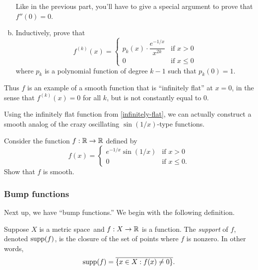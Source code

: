 \begin{exercise}
\begin{enumerate}[(a)]
		\begin{hint}
			Like in the previous part, you'll have to give a special argument to prove that $f''(0) = 0$. 
		\end{hint}
		
		\item Inductively, prove that
		\[ f^{(k)}(x) = \begin{cases} p_k(x) \cdot \dfrac{e^{-1/x}}{x^{2k}} & \text{if } x > 0 \\ 0 & \text{if } x \leq 0 \end{cases} \]
		where $p_k$ is a polynomial function of degree $k-1$ such that $p_k(0) = 1$. 
	\end{enumerate}
	Thus $f$ is an example of a smooth function that is ``infinitely flat'' at $x = 0$, in the sense that $f^{(k)}(x) = 0$ for all $k$, but is not constantly equal to 0. 
\end{exercise}

Using the infinitely flat function from \cref{infinitely-flat}, we can actually construct a smooth analog of the crazy oscillating $\sin(1/x)$-type functions. 

\begin{exercise}
	Consider the function $f : \mathbb{R} \to \mathbb{R}$ defined by
	\[ f(x) = \begin{cases} e^{-1/x}\sin(1/x) & \text{if } x > 0 \\ 0 & \text{if } x \leq 0. \end{cases} \]
	Show that $f$ is smooth. 
\end{exercise}

\subsubsection*{Bump functions}

Next up, we have ``bump functions.'' We begin with the following definition. 

\begin{definition}  \label{support}
	Suppose $X$ is a metric space\footnotemark\ and $f : X \to \mathbb{R}$ is a function. The \emph{support} of $f$, denoted $\operatorname{supp}(f)$, is the closure of the set of points where $f$ is nonzero. In other words, 
	\[ \operatorname{supp}(f) = \overline{\{ x \in X : f(x) \neq 0 \}}. \]
\end{definition}


